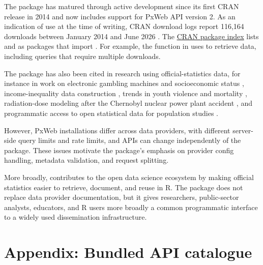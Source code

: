 The package has matured through active development since its first CRAN release in 2014 and now includes support for PxWeb API version 2.
As an indication of use at the time of writing, CRAN download logs report 116,164 downloads between January 2014 and June 2026 \citep{CranlogsPxweb2026}.
The \href{https://CRAN.R-project.org/package=pxweb}{CRAN package index} lists  \citep{BFS} and  \citep{PxWebApiData} as packages that import .
For example, the  function in  uses  to retrieve data, including queries that require multiple downloads.

The  package has also been cited in research using official-statistics data, for instance in work on electronic gambling machines and socioeconomic status \citep{raisamo2019density}, income-inequality data construction \citep{Solt2019}, trends in youth violence and mortality \citep{Tanskanen2026, Hakkarainen2026}, radiation-dose modeling after the Chernobyl nuclear power plant accident \citep{Tondel2025}, and programmatic access to open statistical data for population studies \citep{willekens2023sdmx}.

However, PxWeb installations differ across data providers, with different server-side query limits and rate limits, and APIs can change independently of the  package.
These issues motivate the package's emphasis on provider config handling, metadata validation, and request splitting.

More broadly,  contributes to the open data science ecosystem \citep{lahti2018open} by making official statistics easier to retrieve, document, and reuse in R.
The package does not replace data provider documentation, but it gives researchers, public-sector analysts, educators, and R users more broadly a common programmatic interface to a widely used dissemination infrastructure.

\clearpage

\section{Appendix: Bundled API catalogue}


